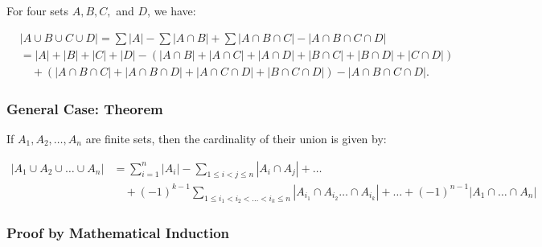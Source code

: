 \documentclass[12pt]{article}
\begin{document}
\begin{center}
\end{center}

For four sets $A, B, C,$ and $D$, we have:

\begin{align*}
& |A \cup B \cup C \cup D| =
\sum |A| - \sum |A \cap B| + \sum |A \cap B \cap C| - |A \cap B \cap C \cap D|\\
& = |A| + |B| + |C| + |D| -(|A \cap B| + |A \cap C| + |A \cap D| + |B \cap C| + |B \cap D| + |C \cap D|)\\
& \quad +( |A \cap B \cap C| + |A \cap B \cap D| + |A \cap C \cap D| + |B \cap C \cap D|) - |A \cap B \cap C \cap D|.
\end{align*}
  
\subsubsection*{General Case: Theorem}

If $A_1, A_2, \dots, A_n$ are finite sets, then the cardinality of their union is given by:

\begin{align*}
|A_1 \cup A_2 \cup \dots \cup A_n| &= \sum_{i=1}^n |A_i| - \sum_{1 \le i < j \le n} |A_i \cap A_j| + \dots \\
&\quad + (-1)^{k-1} \sum_{1 \le i_1 < i_2 < \dots < i_k \le n} |A_{i_1} \cap A_{i_2} \dots \cap A_{i_k}| + \dots + (-1)^{n-1} |A_1 \cap \dots \cap A_n|
\end{align*}

\subsubsection*{Proof by Mathematical Induction}
\end{document}
